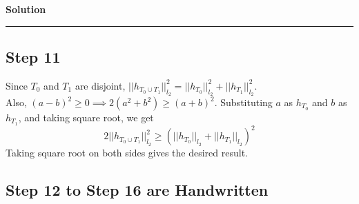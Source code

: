 \documentclass[a4paper,12pt]{article}
\newenvironment{solution}[2][]{%
    \begin{mdframed}[linecolor=blue!70!black, linewidth=2pt, roundcorner=10pt, backgroundcolor=yellow!10!white, skipabove=12pt, skipbelow=12pt]%
        \textbf{\large #2}
        \par\noindent\rule{\textwidth}{0.4pt}
}{
    \end{mdframed}
}
\begin{document}
\begin{solution}{Solution}
\subsection*{Step 11}
Since $T_0$ and $T_1$ are disjoint, $||h_{T_0 \cup T_1 }||_{l_2}^2 = ||h_{T_0}||_{l_2}^2+||h_{T_1}||_{l_2}^2 $.\\
Also, $(a-b)^2 \geq 0 \implies2(a^2+b^2) \geq (a+b)^2$. Substituting $a$ as $h_{T_0}$ and $b$ as $h_{T_1}$, and taking square root, we get
\[
2||h_{T_0 \cup T_1}||_{l_2}^2 \geq (||h_{T_0}||_{l_2}+||h_{T_1}||_{l_2})^2
\]
Taking square root on both sides gives the desired result.

\subsection*{Step 12 to Step 16 are Handwritten}
\end{solution}
\end{document}
